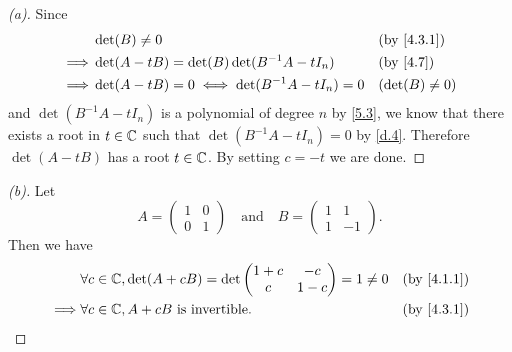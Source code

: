 \begin{proof}[(a)]
  Since
  \begin{align*}
             & \det(B) \neq 0                                   &  & \text{(by \cref{4.3.1})} \\
    \implies & \det(A - tB) = \det(B) \det(B^{-1} A - t I_n)    &  & \text{(by \cref{4.7})}   \\
    \implies & \det(A - tB) = 0 \iff \det(B^{-1} A - t I_n) = 0 &  & (\det(B) \neq 0)
  \end{align*}
  and \(\det(B^{-1} A - t I_n)\) is a polynomial of degree \(n\) by \cref{5.3}, we know that there exists a root in \(t \in \mathbb{C}\) such that \(\det(B^{-1} A - t I_n) = 0\) by \cref{d.4}.
  Therefore \(\det(A - tB)\) has a root \(t \in \mathbb{C}\).
  By setting \(c = -t\) we are done.
\end{proof}

\begin{proof}[(b)]
  Let
  \[
    A = \begin{pmatrix}
      1 & 0 \\
      0 & 1
    \end{pmatrix} \quad \text{and} \quad B = \begin{pmatrix}
      1 & 1  \\
      1 & -1
    \end{pmatrix}.
  \]
  Then we have
  \begin{align*}
             & \forall c \in \C, \det(A + cB) = \det\begin{pmatrix}
                                                      1 + c & -c    \\
                                                      c     & 1 - c
                                                    \end{pmatrix} = 1 \neq 0 &  & \text{(by \cref{4.1.1})} \\
    \implies & \forall c \in \C, A + cB \text{ is invertible}.      &  & \text{(by \cref{4.3.1})}
  \end{align*}
\end{proof}
